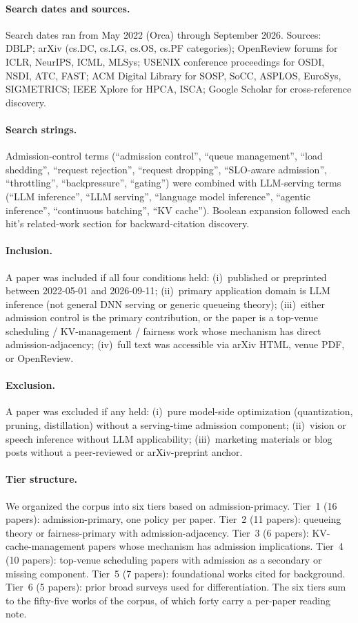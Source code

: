 \paragraph{Search dates and sources.} Search dates ran from May 2022
(Orca) through September 2026. Sources: DBLP; arXiv (cs.DC, cs.LG,
cs.OS, cs.PF categories); OpenReview forums for ICLR, NeurIPS, ICML,
MLSys; USENIX conference proceedings for OSDI, NSDI, ATC, FAST; ACM
Digital Library for SOSP, SoCC, ASPLOS, EuroSys, SIGMETRICS; IEEE
Xplore for HPCA, ISCA; Google Scholar for cross-reference discovery.

\paragraph{Search strings.} Admission-control terms (``admission
control'', ``queue management'', ``load shedding'', ``request
rejection'', ``request dropping'', ``SLO-aware admission'',
``throttling'', ``backpressure'', ``gating'') were combined with
LLM-serving terms (``LLM inference'', ``LLM serving'', ``language
model inference'', ``agentic inference'', ``continuous batching'',
``KV cache''). Boolean expansion followed each hit's related-work
section for backward-citation discovery.

\paragraph{Inclusion.} A paper was included if all four conditions
held: (i)~published or preprinted between 2022-05-01 and 2026-09-11;
(ii)~primary application domain is LLM inference (not general DNN
serving or generic queueing theory); (iii)~either admission control is
the primary contribution, or the paper is a top-venue scheduling /
KV-management / fairness work whose mechanism has direct
admission-adjacency; (iv)~full text was accessible via arXiv HTML,
venue PDF, or OpenReview.

\paragraph{Exclusion.} A paper was excluded if any held: (i)~pure
model-side optimization (quantization, pruning, distillation) without
a serving-time admission component; (ii)~vision or speech inference
without LLM applicability; (iii)~marketing materials or blog posts
without a peer-reviewed or arXiv-preprint anchor.

\paragraph{Tier structure.} We organized the corpus into six tiers
based on admission-primacy. Tier~1 (16 papers): admission-primary,
one policy per paper. Tier~2 (11 papers): queueing theory or
fairness-primary with admission-adjacency. Tier~3 (6 papers):
KV-cache-management papers whose mechanism has admission
implications. Tier~4 (10 papers): top-venue scheduling papers with
admission as a secondary or missing component. Tier~5 (7 papers):
foundational works cited for background. Tier~6 (5 papers): prior
broad surveys used for differentiation. The six tiers sum to the
fifty-five works of the corpus, of which forty carry a per-paper
reading note.

